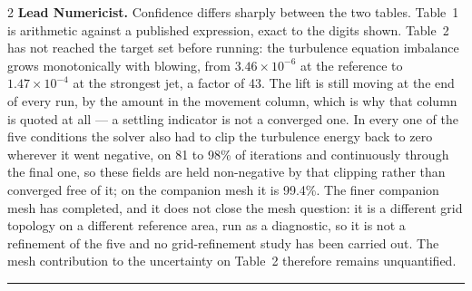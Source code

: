 \documentclass[8pt,a4paper]{extarticle}
\newcommand{\shead}[1]{\vspace{1pt}{\color{navy}\bfseries\large #1}\vspace{1pt}\hrule\vspace{3pt}}
\newcommand{\role}[1]{{\color{navy}\bfseries #1.}}
\begin{document}
\begin{multicols}{2}
\role{Lead Numericist} Confidence differs sharply between the two tables.
Table~1 is arithmetic against a published expression, exact to the digits shown.
Table~2 has not reached the target set before running: the turbulence equation
imbalance grows monotonically with blowing, from $3.46 \times 10^{-6}$ at the reference
to $1.47 \times 10^{-4}$ at the strongest jet, a factor of 43. The lift is
still moving at the end of every run, by the amount in the movement column,
which is why that column is quoted at all --- a settling indicator is not a
converged one. In every one of the five conditions the solver also had to clip
the turbulence energy back to zero wherever it went negative, on
81 to 98\% of iterations and continuously
through the final one, so these fields are held non-negative by that clipping
rather than converged free of it; on the companion mesh it is
99.4\%. The finer companion mesh has completed,
and it does not close the mesh question: it is a different grid topology on a
different reference area, run as a diagnostic, so it is not a refinement of the
five and no grid-refinement study has been carried out. The mesh contribution
to the uncertainty on Table~2 therefore remains unquantified.
\end{multicols}

\shead{Figure notes}
\end{document}
